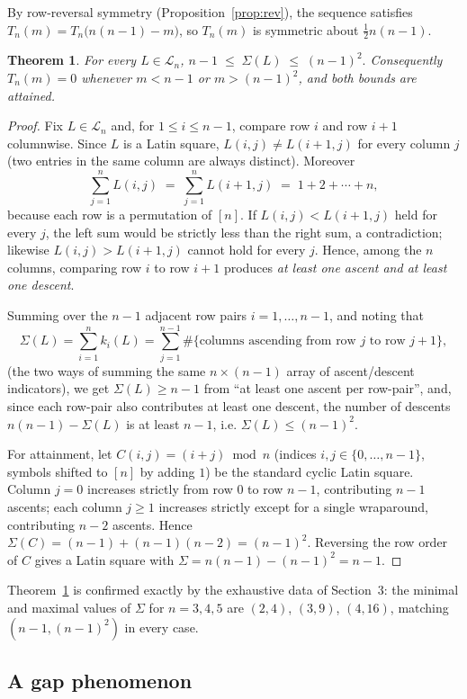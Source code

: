 \documentclass[11pt]{amsart}
\newtheorem{theorem}{Theorem}[section]
\begin{document}
By row-reversal symmetry (Proposition~\ref{prop:rev}), the sequence satisfies $T_n(m) = T_n\bigl(n(n-1) - m\bigr)$, so $T_n(m)$ is symmetric about $\frac{1}{2}n(n-1)$.
\begin{theorem}\label{thm:bounds}
For every $L\in\mathcal L_n$, $n-1 \;\le\; \Sigma(L) \;\le\; (n-1)^2 .$
Consequently $T_n(m)=0$ whenever $m<n-1$ or $m>(n-1)^2$, and both bounds are attained.
\end{theorem}

\begin{proof}
Fix $L\in\mathcal L_n$ and, for $1\le i\le n-1$, compare row $i$ and row $i+1$ columnwise. Since $L$ is a Latin square, $L(i,j)\ne L(i+1,j)$ for every column $j$ (two entries in the same column are always distinct). Moreover
\[
\sum_{j=1}^n L(i,j) \;=\; \sum_{j=1}^n L(i+1,j) \;=\; 1+2+\cdots+n,
\]
because each row is a permutation of $[n]$. If $L(i,j)<L(i+1,j)$ held for every $j$, the left sum would be strictly less than the right sum, a contradiction; likewise $L(i,j)>L(i+1,j)$ cannot hold for every $j$. Hence, among the $n$ columns, comparing row $i$ to row $i+1$ produces \emph{at least one ascent and at least one descent}.

Summing over the $n-1$ adjacent row pairs $i=1,\dots,n-1$, and noting that
\[
\Sigma(L)=\sum_{i=1}^n k_i(L)=\sum_{j=1}^{n-1}\#\{\text{columns ascending from row }j\text{ to row }j+1\},
\]
(the two ways of summing the same $n\times(n-1)$ array of ascent/descent indicators), we get $\Sigma(L)\ge n-1$ from ``at least one ascent per row-pair'', and, since each row-pair also contributes at least one descent, the number of descents $n(n-1)-\Sigma(L)$ is at least $n-1$, i.e. $\Sigma(L)\le (n-1)^2$.

For attainment, let $C(i,j)=(i+j)\bmod n$ (indices $i,j\in\{0,\dots,n-1\}$, symbols shifted to $[n]$ by adding $1$) be the standard cyclic Latin square. Column $j=0$ increases strictly from row $0$ to row $n-1$, contributing $n-1$ ascents; each column $j\ge 1$ increases strictly except for a single wraparound, contributing $n-2$ ascents. Hence $\Sigma(C)=(n-1)+(n-1)(n-2)=(n-1)^2$. Reversing the row order of $C$ gives a Latin square with $\Sigma=n(n-1)-(n-1)^2=n-1$.
\end{proof}

Theorem~\ref{thm:bounds} is confirmed exactly by the exhaustive data of Section~3: the minimal and maximal values of $\Sigma$ for $n=3,4,5$ are $(2,4)$, $(3,9)$, $(4,16)$, matching $(n-1,(n-1)^2)$ in every case.

\subsection{A gap phenomenon}
\end{document}
